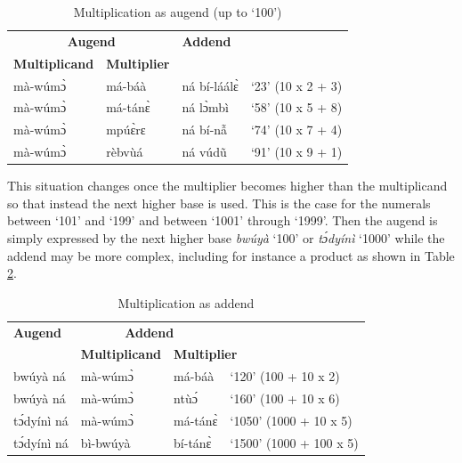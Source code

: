 \begin{table} 
\centering
\begin{tabular}{lll|l}
 \midrule
\multicolumn{2}{c}{\bfseries Augend} & \multicolumn{2}{l}{\bfseries Addend} \\
{\bfseries Multiplicand} & {\bfseries Multiplier} &   \multicolumn{2}{l}{}  \\
  \midrule
mà-wúmɔ̀ & má-báà &   ná bí-láálɛ̀ & `23' (10 x 2 + 3)\\
mà-wúmɔ̀ & má-tánɛ̀  &   ná lɔ̀mbì & `58' (10 x 5 + 8) \\
mà-wúmɔ̀ & mpúɛ̀rɛ &   ná bí-nẫ & `74' (10 x 7 + 4) \\
mà-wúmɔ̀ & rèbvùá &  ná vúdũ & `91' (10 x 9 + 1) \\
  \midrule
\end{tabular}
\caption{Multiplication as augend (up to `100')}
\label{tab:NumOrder1}
\end{table}

\noindent This situation changes once the multiplier becomes higher than the multiplicand so that instead the next higher base is used. This is the case for the numerals between `101' and `199' and between `1001' through `1999'. Then the augend is simply expressed by the next higher base {\itshape bwúyà} `100' or {\itshape tɔ́dyínì} `1000' while the addend may be more complex, including for instance a product as shown in Table \ref{tab:NumOrder2}. 

\begin{table} 
\centering
\begin{tabular}{lll|l}
 \midrule
{\bfseries Augend} & \multicolumn{2}{c}{\bfseries Addend} &  \\
 & {\bfseries Multiplicand} & \multicolumn{2}{l}{\bfseries Multiplier}  \\
  \midrule
bwúyà ná & mà-wúmɔ̀ &  má-báà & `120' (100 + 10 x 2) \\
bwúyà ná & mà-wúmɔ̀   &  ntùɔ́ & `160' (100 + 10 x 6) \\
tɔ́dyínì ná & mà-wúmɔ̀ & má-tánɛ̀  & `1050' (1000 + 10 x 5) \\
tɔ́dyínì ná & bì-bwúyà & bí-tánɛ̀ & `1500' (1000 + 100 x 5) \\
  \midrule
\end{tabular}
\caption{Multiplication as addend}
\label{tab:NumOrder2}
\end{table}

